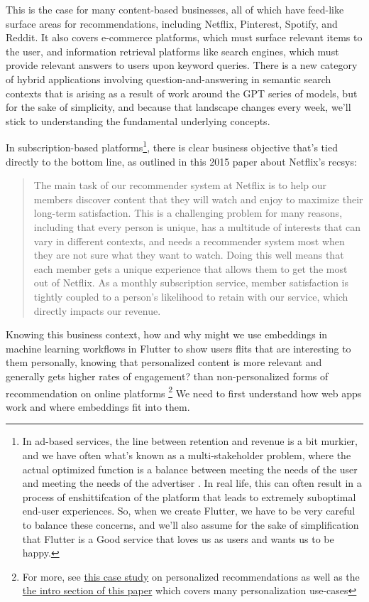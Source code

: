 \documentclass[11pt, table]{diazessay} %
\begin{document}
\begin{sloppypar}
This is the case for many content-based businesses, all of which have feed-like surface areas for recommendations, including Netflix, Pinterest, Spotify, and Reddit.  It also covers e-commerce platforms, which must surface relevant items to the user, and information retrieval platforms like search engines, which must provide relevant answers to users upon keyword queries. There is a new category of hybrid applications involving question-and-answering in semantic search contexts that is arising as a result of work around the GPT series of models, but for the sake of simplicity, and because that landscape changes every week, we'll stick to understanding the fundamental underlying concepts.

In subscription-based platforms\footnote{In ad-based services, the line between retention and revenue is a bit murkier, and we have often what's known as a multi-stakeholder problem, where the actual optimized function is a balance between meeting the needs of the user and meeting the needs of the advertiser \citep{zheng2017multi}.  In real life, this can often result in a process of enshittifcation \citep{doctorow_2023} of the platform that leads to extremely suboptimal end-user experiences. So, when we create Flutter, we have to be very careful to balance these concerns, and we'll also assume for the sake of simplification that Flutter is a Good service that loves us as users and wants us to be happy.}, there is clear business objective that's tied directly to the bottom line, as outlined in this 2015 paper  \citep{steck2021deep}  about Netflix's recsys:

\begin{quote}

The main task of our recommender system at Netflix is to help our members discover content that they will watch and enjoy to maximize their long-term satisfaction. This is a challenging problem for many reasons, including that every person is unique, has a multitude of interests that can vary in different contexts, and needs a recommender system most when they are not sure what they want to watch. Doing this well means that each member gets a unique experience that allows them to get the most out of Netflix. As a monthly subscription service, member satisfaction is tightly coupled to a person’s likelihood to retain with our service, which directly impacts our revenue.
\end{quote}

Knowing this business context, how and why might we use embeddings in machine learning workflows in Flutter to show users flits that are interesting to them personally, knowing that personalized content is more relevant and generally gets higher rates of engagement? \citep{jannach2010recommender}  than non-personalized forms of recommendation on online platforms \footnote{For more, see  \href{http://www.recommenderbook.net/media/Recommender_Systems_An_Introduction_Chapter08_Case_study.pdf}{this case study} on personalized recommendations as well as  the \href{https://www.arxiv-vanity.com/papers/1906.03109/}{the intro section of this paper} which covers many personalization use-cases}  We need to first understand how web apps work and where embeddings fit into them.


\end{sloppypar}
\end{document}
